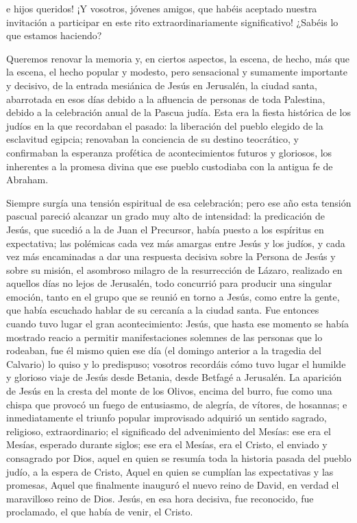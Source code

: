 \begin{body}
 e hijos queridos! ¡Y vosotros, jóvenes amigos, que habéis aceptado nuestra invitación a participar en este rito extraordinariamente significativo! ¿Sabéis lo que estamos haciendo?

Queremos renovar la memoria y, en ciertos aspectos, la escena, de hecho, más que la escena, el hecho popular y modesto, pero sensacional y sumamente importante y decisivo, de la entrada mesiánica de Jesús en Jerusalén, la ciudad santa, abarrotada en esos días debido a la afluencia de personas de toda Palestina, debido a la celebración anual de la Pascua judía. Esta era la fiesta histórica de los judíos en la que recordaban el pasado: la liberación del pueblo elegido de la esclavitud egipcia; renovaban la conciencia de su destino teocrático, y confirmaban la esperanza profética de acontecimientos futuros y gloriosos, los inherentes a la promesa divina que ese pueblo custodiaba con la antigua fe de Abraham.


Siempre surgía una tensión espiritual de esa celebración; pero ese año esta tensión pascual pareció alcanzar un grado muy alto de intensidad: la predicación de Jesús, que sucedió a la de Juan el Precursor, había puesto a los espíritus en expectativa; las polémicas cada vez más amargas entre Jesús y los judíos, y cada vez más encaminadas a dar una respuesta decisiva sobre la Persona de Jesús y sobre su misión, el asombroso milagro de la resurrección de Lázaro, realizado en aquellos días no lejos de Jerusalén, todo concurrió para producir una singular emoción, tanto en el grupo que se reunió en torno a Jesús, como entre la gente, que había escuchado hablar de su cercanía a la ciudad santa. Fue entonces cuando tuvo lugar el gran acontecimiento: Jesús, que hasta ese momento se había mostrado reacio a permitir manifestaciones solemnes de las personas que lo rodeaban, fue él mismo quien ese día (el domingo anterior a la tragedia del Calvario) lo quiso y lo predispuso; vosotros recordáis cómo tuvo lugar el humilde y glorioso viaje de Jesús desde Betania, desde Betfagé a Jerusalén. La aparición de Jesús en la cresta del monte de los Olivos, encima del burro, fue como una chispa que provocó un fuego de entusiasmo, de alegría, de vítores, de hosannas; e inmediatamente el triunfo popular improvisado adquirió un sentido sagrado, religioso, extraordinario; el significado del advenimiento del Mesías: ese era el Mesías, esperado durante siglos; ese era el Mesías, era el Cristo, el enviado y consagrado por Dios, aquel en quien se resumía toda la historia pasada del pueblo judío, a la espera de Cristo, Aquel en quien se cumplían las expectativas y las promesas, Aquel que finalmente inauguró el nuevo reino de David, en verdad el maravilloso reino de Dios. Jesús, en esa hora decisiva, fue reconocido, fue proclamado, el que había de venir, el Cristo.


\end{body}
